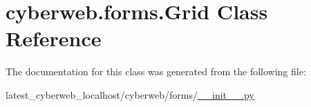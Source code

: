 \hypertarget{classcyberweb_1_1forms_1_1_grid}{\section{cyberweb.\-forms.\-Grid \-Class \-Reference}
\label{classcyberweb_1_1forms_1_1_grid}
}


\-The documentation for this class was generated from the following file\-:\begin{DoxyCompactItemize}
\item 
latest\-\_\-cyberweb\-\_\-localhost/cyberweb/forms/\hyperlink{forms_2____init_____8py}{\-\_\-\-\_\-init\-\_\-\-\_\-.\-py}\end{DoxyCompactItemize}
